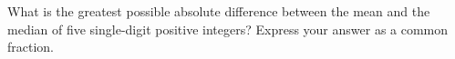 What is the greatest possible absolute difference between the mean and the median of five single-digit positive integers? Express your answer as a common fraction.
